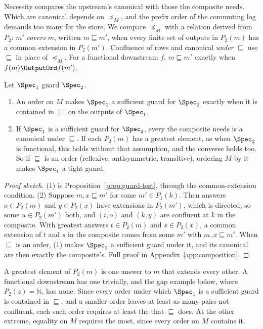 Necessity compares the upstream's canonical \commitments with those the
composite needs.  Which \commitments are canonical depends on $\preceq_M$, and
the prefix order of the commuting log demands too many for the store.  We compare
$\preceq_M$ with a relation derived from $P_2$: $m'$ \emph{covers} $m$,
written $m\sqsubseteq m'$, when every finite set of outputs in $P_2(m)$ has a
common extension in $P_2(m')$.  Confluence of rows and canonical
\commitments \emph{under} $\sqsubseteq$ use $\sqsubseteq$ in place of
$\preceq_M$.
For a functional downstream $f$, $m\sqsubseteq m'$ exactly when
$f(m)\OutputOrd f(m')$.

\begin{theorem}
\label{thm:guard-tightening}
Let $\Spec_1$ guard $\Spec_2$.
\begin{enumerate}
    \item An order on $M$ makes $\Spec_1$ a sufficient guard for $\Spec_2$
        exactly when it is contained in $\sqsubseteq$ on the outputs of
        $\Spec_1$.
    \item If $\Spec_1$ is a sufficient guard for $\Spec_2$, every \commitment
        the composite needs is a canonical \commitment under $\sqsubseteq$.
        If each $P_2(m)$ has a greatest element, as when $\Spec_2$ is
        functional, this holds without that assumption, and the converse
        holds too.  So if $\sqsubseteq$ is an
        order (reflexive, antisymmetric, transitive), ordering $M$ by it makes
        $\Spec_1$ a tight guard.
\end{enumerate}
\end{theorem}

\begin{proof}[Proof sketch]
(1) is Proposition~\ref{prop:guard-test}, through the
common-extension condition.  (2) Suppose
$m,x\sqsubseteq m'$ for some $m'\in P_1(k)$.  Then answers $o\in P_2(m)$ and
$y\in P_2(x)$ have extensions in $P_2(m')$, which is directed, so some
$u\in P_2(m')$ \outrel both, and $(i,o)$ and $(k,y)$ are confluent at $k$ in
the composite.  With
greatest answers $t\in P_2(m)$ and $s\in P_2(x)$, a common extension of $t$
and $s$ in the composite comes from some $m'$ with $m,x\sqsubseteq m'$.  When
$\sqsubseteq$ is an order, (1) makes $\Spec_1$ a sufficient guard under it,
and its canonical \commitments are then exactly the composite's.  Full proof in
Appendix~\ref{app:composition}.
\end{proof}

A greatest element of $P_2(m)$ is one answer to $m$ that extends every
other.  A functional downstream has one trivially, and the gap example below,
where $P_2(z)=\mathbb N$, has none.  Since every order under which $\Spec_1$ is
a sufficient guard is contained in $\sqsubseteq$, and a smaller order leaves at least as many pairs not confluent, each such order requires at least the
\commitments that $\sqsubseteq$ does.  At the other extreme, equality on $M$
requires the most, since every order on $M$ contains it.

